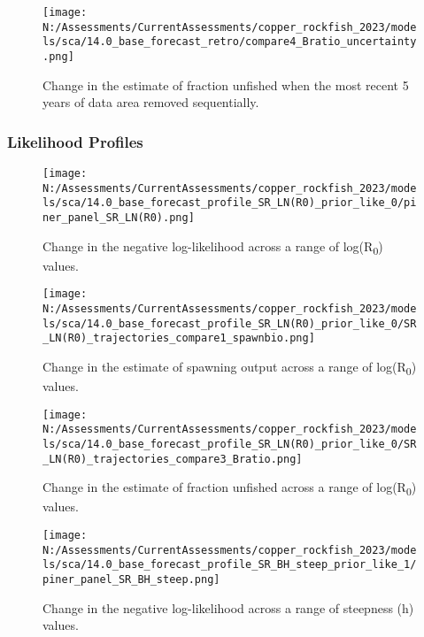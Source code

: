 \documentclass[11pt,
  english,
  letterpaper,
]{article}
\begin{document}
\pagebreak

\begin{figure}
\centering
\texttt{[image: N:/Assessments/CurrentAssessments/copper\_rockfish\_2023/models/sca/14.0\_base\_forecast\_retro/compare4\_Bratio\_uncertainty.png]}
\caption{Change in the estimate of fraction unfished when the most recent 5 years of data area removed sequentially.\label{fig:retro-depl}}
\end{figure}

\hypertarget{likelihood-profiles-1}{%
\subsubsection{Likelihood Profiles}\label{likelihood-profiles-1}}

\begin{figure}
\centering
\texttt{[image: N:/Assessments/CurrentAssessments/copper\_rockfish\_2023/models/sca/14.0\_base\_forecast\_profile\_SR\_LN(R0)\_prior\_like\_0/piner\_panel\_SR\_LN(R0).png]}
\caption{Change in the negative log-likelihood across a range of log(R\textsubscript{0}) values.\label{fig:r0-profile}}
\end{figure}

\pagebreak

\begin{figure}
\centering
\texttt{[image: N:/Assessments/CurrentAssessments/copper\_rockfish\_2023/models/sca/14.0\_base\_forecast\_profile\_SR\_LN(R0)\_prior\_like\_0/SR\_LN(R0)\_trajectories\_compare1\_spawnbio.png]}
\caption{Change in the estimate of spawning output across a range of log(R\textsubscript{0}) values.\label{fig:r0-ssb}}
\end{figure}

\pagebreak

\begin{figure}
\centering
\texttt{[image: N:/Assessments/CurrentAssessments/copper\_rockfish\_2023/models/sca/14.0\_base\_forecast\_profile\_SR\_LN(R0)\_prior\_like\_0/SR\_LN(R0)\_trajectories\_compare3\_Bratio.png]}
\caption{Change in the estimate of fraction unfished across a range of log(R\textsubscript{0}) values.\label{fig:r0-depl}}
\end{figure}

\pagebreak

\begin{figure}
\centering
\texttt{[image: N:/Assessments/CurrentAssessments/copper\_rockfish\_2023/models/sca/14.0\_base\_forecast\_profile\_SR\_BH\_steep\_prior\_like\_1/piner\_panel\_SR\_BH\_steep.png]}
\caption{Change in the negative log-likelihood across a range of steepness (h) values.\label{fig:h-profile}}
\end{figure}
\end{document}
